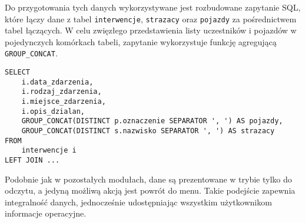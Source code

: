 Do przygotowania tych danych wykorzystywane jest rozbudowane zapytanie SQL, które łączy dane z tabel \texttt{interwencje}, \texttt{strazacy} oraz \texttt{pojazdy} za pośrednictwem tabel łączących. W celu zwięzłego przedstawienia listy uczestników i pojazdów w pojedynczych komórkach tabeli, zapytanie wykorzystuje funkcję agregującą \texttt{GROUP\_CONCAT}.

\begin{lstlisting}[style=sqlStyle, caption={Fragment zapytania SQL agregującego dane dla widoku interwencji.}, label={lst:group_concat}]
SELECT
    i.data_zdarzenia,
    i.rodzaj_zdarzenia,
    i.miejsce_zdarzenia,
    i.opis_dzialan,
    GROUP_CONCAT(DISTINCT p.oznaczenie SEPARATOR ', ') AS pojazdy,
    GROUP_CONCAT(DISTINCT s.nazwisko SEPARATOR ', ') AS strazacy
FROM
    interwencje i
LEFT JOIN ...
\end{lstlisting}

Podobnie jak w pozostałych modułach, dane są prezentowane w trybie tylko do odczytu, a jedyną możliwą akcją jest powrót do menu. Takie podejście zapewnia integralność danych, jednocześnie udostępniając wszystkim użytkownikom informacje operacyjne.